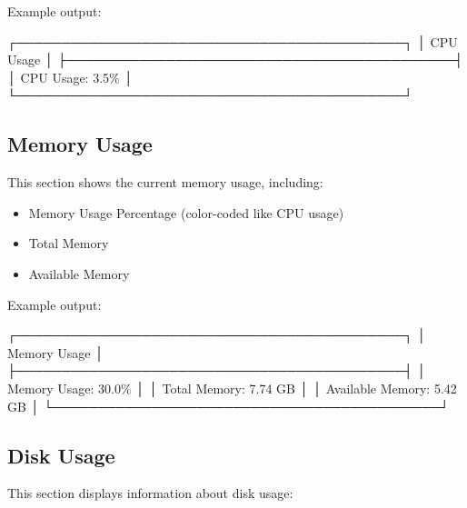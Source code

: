 \documentclass[
  letterpaper,
  DIV=11,
  numbers=noendperiod]{scrreprt}
\newenvironment{Shaded}{\begin{snugshade}}{\end{snugshade}}
\newcommand{\ExtensionTok}[1]{\textcolor[rgb]{0.00,0.23,0.31}{#1}}
\newcommand{\NormalTok}[1]{\textcolor[rgb]{0.00,0.23,0.31}{#1}}
\providecommand{\tightlist}{%
  \setlength{\itemsep}{0pt}\setlength{\parskip}{0pt}}\usepackage{longtable,booktabs,array}
\begin{document}
Example output:

\begin{Shaded}
\begin{Highlighting}[]
\ExtensionTok{┌───────────────────────────────────────────┐}
\ExtensionTok{│}\NormalTok{ CPU Usage                                 │}
\ExtensionTok{├───────────────────────────────────────────┤}
\ExtensionTok{│}\NormalTok{ CPU Usage: 3.5\%                           │}
\ExtensionTok{└───────────────────────────────────────────┘}
\end{Highlighting}
\end{Shaded}

\subsection*{Memory Usage}\label{memory-usage}

This section shows the current memory usage, including:

\begin{itemize}
\tightlist
\item
  Memory Usage Percentage (color-coded like CPU usage)
\item
  Total Memory
\item
  Available Memory
\end{itemize}

Example output:

\begin{Shaded}
\begin{Highlighting}[]
\ExtensionTok{┌───────────────────────────────────────────┐}
\ExtensionTok{│}\NormalTok{ Memory Usage                              │}
\ExtensionTok{├───────────────────────────────────────────┤}
\ExtensionTok{│}\NormalTok{ Memory Usage: 30.0\%                       │}
\ExtensionTok{│}\NormalTok{ Total Memory: 7.74 GB                     │}
\ExtensionTok{│}\NormalTok{ Available Memory: 5.42 GB                 │}
\ExtensionTok{└───────────────────────────────────────────┘}
\end{Highlighting}
\end{Shaded}

\subsection*{Disk Usage}\label{disk-usage-1}

This section displays information about disk usage:
\end{document}
